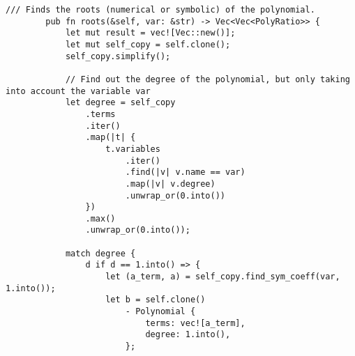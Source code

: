 {    \begin{lstlisting}[caption={The implementation of the \texttt{roots()} method for the \texttt{Polynomial} struct}, label={lst:polynomial-roots}]
        /// Finds the roots (numerical or symbolic) of the polynomial.
        pub fn roots(&self, var: &str) -> Vec<Vec<PolyRatio>> {
            let mut result = vec![Vec::new()];
            let mut self_copy = self.clone();
            self_copy.simplify();

            // Find out the degree of the polynomial, but only taking into account the variable var
            let degree = self_copy
                .terms
                .iter()
                .map(|t| {
                    t.variables
                        .iter()
                        .find(|v| v.name == var)
                        .map(|v| v.degree)
                        .unwrap_or(0.into())
                })
                .max()
                .unwrap_or(0.into());

            match degree {
                d if d == 1.into() => {
                    let (a_term, a) = self_copy.find_sym_coeff(var, 1.into());
                    let b = self.clone()
                        - Polynomial {
                            terms: vec![a_term],
                            degree: 1.into(),
                        };


\end{lstlisting}}
